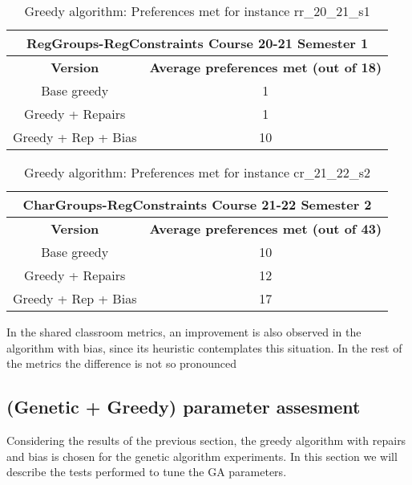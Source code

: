 \begin{table}[H]
    \centering
    \caption{Greedy algorithm: Preferences met for instance rr\_20\_21\_s1}
    \label{table-prefs-01}
    \begin{tabular}{|c|c|}
        \hline
        \multicolumn{2}{|c|}{\textbf{RegGroups-RegConstraints Course 20-21 Semester 1}} \\
        \hline
        \textbf{Version} & \textbf{Average preferences met (out of 18)} \\
        \hline
        \rowcolor{blue!30}
        Base greedy & 1 \\
        \rowcolor{blue!10}
        Greedy + Repairs & 1 \\
        \rowcolor{blue!30}
        Greedy + Rep + Bias & 10 \\
        \hline
    \end{tabular}
\end{table}


\begin{table}[H]
    \centering
    \caption{Greedy algorithm: Preferences met for instance cr\_21\_22\_s2}
    \label{table-prefs-02}
    \begin{tabular}{|c|c|}
        \hline
        \multicolumn{2}{|c|}{\textbf{CharGroups-RegConstraints Course 21-22 Semester 2}} \\
        \hline
        \textbf{Version} & \textbf{Average preferences met (out of 43)} \\
        \hline
        \rowcolor{blue!30}
        Base greedy & 10 \\
        \rowcolor{blue!10}
        Greedy + Repairs & 12 \\
        \rowcolor{blue!30}
        Greedy + Rep + Bias & 17 \\
        \hline
    \end{tabular}
\end{table}

In the shared classroom metrics, an improvement is also observed in the algorithm with bias, since its heuristic contemplates this situation. In the rest of the metrics the difference is not so pronounced


\subsection{(Genetic + Greedy) parameter assesment}

Considering the results of the previous section, the greedy algorithm with repairs and bias is chosen for the genetic algorithm experiments. In this section we will describe the tests performed to tune the GA parameters.

